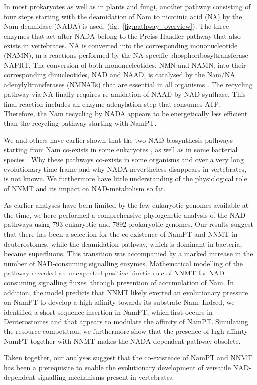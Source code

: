 In most prokaryotes as well as in plants and fungi, another pathway consisting of four steps starting with the deamidation of Nam to nicotinic acid (NA) by the Nam deamidase (NADA) is used. (fig.~\ref{fig:pathway_overview}). The three enzymes that act after NADA belong to the Preiss-Handler pathway that also exists in vertebrates. NA is converted into the corresponding mononucleotide (NAMN), in a reactions performed by the NA-specific phosphoribosyltransferase NAPRT. The conversion of both mononucleotides, NMN and NAMN, into their corresponding dinucleotides, NAD and NAAD, is catalysed by the Nam/NA adenylyltransferases (NMNATs) that are essential in all organisms \cite{DeFigueiredo2011}. The recycling pathway via NA finally requires re-amidation of NAAD by NAD synthase. This final reaction includes an enzyme adenylation step that consumes ATP. Therefore, the Nam recycling by NADA appears to be energetically less efficient than the recycling pathway starting with NamPT.

We and others have earlier shown that the two NAD biosynthesis pathways starting from Nam co-exists in some eukaryotes \cite{Gossmann2012FEBS,Carneiro2013}, as well as in some bacterial species \cite{Gazzaniga2009}. Why these pathways co-exists in some organisms and over a very long evolutionary time frame and why NADA nevertheless disappears in vertebrates, is not known. We furthermore have little understanding of the physiological role of NNMT and its impact on NAD-metabolism so far.

As earlier analyses have been limited by the few eukaryotic genomes available at the time, we here performed a comprehensive phylogenetic analysis of the NAD pathways using 793 eukaryotic and 7892 prokaryotic genomes. Our results suggest that there has been a selection for the co-existence of NamPT and NNMT in deuterostomes, while the deamidation pathway, which is dominant in bacteria, became superfluous. This transition was accompanied by a marked increase in the number of NAD-consuming signalling enzymes. Mathematical modelling of the pathway revealed an unexpected positive kinetic role of NNMT for NAD-consuming signalling fluxes, through prevention of accumulation of Nam. In addition, the model predicts that NNMT likely exerted an evolutionary pressure on NamPT to develop a high affinity towards its substrate Nam. Indeed, we identified a short sequence insertion in NamPT, which first occurs in Deuterostomes and that appears to modulate the affinity of NamPT. Simulating the resource competition, we furthermore show that the presence of high affinity NamPT together with NNMT makes the NADA-dependent pathway obsolete.

Taken together, our analyses suggest that the co-existence of NamPT and NNMT has been a prerequisite to enable the evolutionary development of versatile NAD-dependent signalling mechanisms present in vertebrates.
